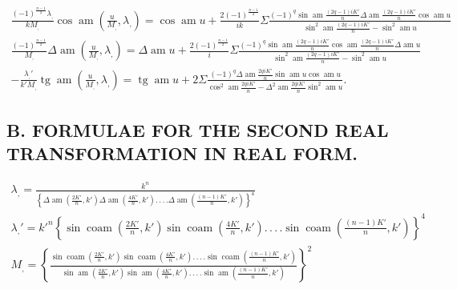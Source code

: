 \documentclass{article}
\begin{document}
\[
\begin{gathered}
\frac{(-1)^{\frac{n-1}{2}}\lambda_{,}}{kM_{,}}\cos\operatorname{am}\left(\frac{u}{M_{,}},\lambda_{,}\right)=\cos\operatorname{am}u+\frac{2(-1)^{\frac{n-1}{2}}}{ik}\Sigma\frac{(-1)^{q}\sin\operatorname{am}\frac{(2q-1)iK'}{n}\Delta\operatorname{am}\frac{(2q-1)iK'}{n}\cos\operatorname{am}u}{\sin^{2}\operatorname{am}\frac{(2q-1)iK'}{n}-\sin^{2}\operatorname{am}u}\\[2.5ex]
\frac{(-1)^{\frac{n-1}{2}}}{M_{,}}\Delta\operatorname{am}\left(\frac{u}{M_{,}},\lambda_{,}\right)=\Delta\operatorname{am}u+\frac{2(-1)^{\frac{n-1}{2}}}{i}\Sigma\frac{(-1)^{q}\sin\operatorname{am}\frac{(2q-1)iK'}{n}\cos\operatorname{am}\frac{(2q-1)iK'}{n}\Delta\operatorname{am}u}{\sin^{2}\operatorname{am}\frac{(2q-1)iK'}{n}-\sin^{2}\operatorname{am}u}\\[2.5ex]
-\frac{\lambda_{,}'}{k'M_{,}}\operatorname{tg}\operatorname{am}\left(\frac{u}{M_{,}},\lambda_{,}\right)=\operatorname{tg}\operatorname{am}u+2\Sigma\frac{(-1)^{q}\Delta\operatorname{am}\frac{2qiK'}{n}\sin\operatorname{am}u\cos\operatorname{am}u}{\cos^{2}\operatorname{am}\frac{2qiK'}{n}-\Delta^{2}\operatorname{am}\frac{2qiK'}{n}\sin^{2}\operatorname{am}u}.
\end{gathered}
\]

\subsection*{B. FORMULAE FOR THE SECOND REAL TRANSFORMATION IN REAL FORM.}

\[
\begin{gathered}
\lambda_{,}=\frac{k^{n}}{\left\{\Delta\operatorname{am}\left(\frac{2K'}{n},k'\right)\Delta\operatorname{am}\left(\frac{4K'}{n},k'\right).\,.\,.\,.\Delta\operatorname{am}\left(\frac{(n-1)K'}{n},k'\right)\right\}^{4}}\\[2.5ex]
\lambda_{,}'=k'^{n}\left\{\sin\operatorname{coam}\left(\frac{2K'}{n},k'\right)\sin\operatorname{coam}\left(\frac{4K'}{n},k'\right).\,.\,.\,.\sin\operatorname{coam}\left(\frac{(n-1)K'}{n},k'\right)\right\}^{4}\\[2.5ex]
M_{,}=\left\{\frac{\sin\operatorname{coam}\left(\frac{2K'}{n},k'\right)\sin\operatorname{coam}\left(\frac{4K'}{n},k'\right).\,.\,.\,.\sin\operatorname{coam}\left(\frac{(n-1)K'}{n},k'\right)}{\sin\operatorname{am}\left(\frac{2K'}{n},k'\right)\sin\operatorname{am}\left(\frac{4K'}{n},k'\right).\,.\,.\,.\sin\operatorname{am}\left(\frac{(n-1)K'}{n},k'\right)}\right\}^{2}
\end{gathered}
\]
\end{document}
